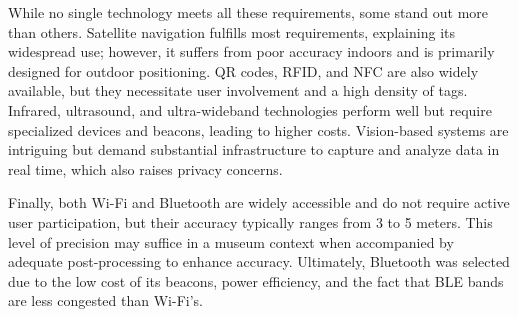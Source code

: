 While no single technology meets all these requirements, some stand out more than others. Satellite navigation fulfills most requirements, explaining its widespread use; however, it suffers from poor accuracy indoors and is primarily designed for outdoor positioning. QR codes, RFID, and NFC are also widely available, but they necessitate user involvement and a high density of tags. Infrared, ultrasound, and ultra-wideband technologies perform well but require specialized devices and beacons, leading to higher costs. Vision-based systems are intriguing but demand substantial infrastructure to capture and analyze data in real time, which also raises privacy concerns.  

Finally, both Wi-Fi and Bluetooth are widely accessible and do not require active user participation, but their accuracy typically ranges from 3 to 5 meters. This level of precision may suffice in a museum context when accompanied by adequate post-processing to enhance accuracy. Ultimately, Bluetooth was selected due to the low cost of its beacons, power efficiency, and the fact that BLE bands are less congested than Wi-Fi's. 


